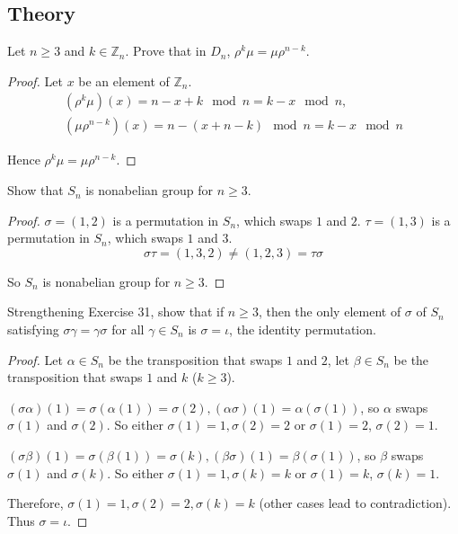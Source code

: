 \subsection*{Theory}

\begin{exercise}
    Let $n\geq 3$ and $k\in\mathbb{Z}_{n}$. Prove that in $D_{n}$, $\rho^{k}\mu = \mu\rho^{n-k}$.
\end{exercise}

\begin{proof}
    Let $x$ be an element of $\mathbb{Z}_{n}$.
    \[
        \begin{split}
            (\rho^{k}\mu)(x) = n - x + k \mod n = k - x\mod n, \\
            (\mu\rho^{n-k})(x) = n - (x + n - k) \mod n = k - x \mod n
        \end{split}
    \]

    Hence $\rho^{k}\mu = \mu\rho^{n-k}$.
\end{proof}

\begin{exercise}
    Show that $S_{n}$ is nonabelian group for $n\geq 3$.
\end{exercise}

\begin{proof}
    $\sigma = (1, 2)$ is a permutation in $S_{n}$, which swaps $1$ and $2$. $\tau = (1, 3)$ is a permutation in $S_{n}$, which swaps $1$ and $3$.
    \[
        \sigma\tau = (1, 3, 2) \ne (1, 2, 3) = \tau\sigma
    \]

    So $S_{n}$ is nonabelian group for $n\geq 3$.
\end{proof}

\begin{exercise}
    Strengthening Exercise 31, show that if $n\geq 3$, then the only element of $\sigma$ of $S_{n}$ satisfying $\sigma\gamma = \gamma\sigma$ for all $\gamma\in S_{n}$ is $\sigma = \iota$, the identity permutation.
\end{exercise}

\begin{proof}
    Let $\alpha\in S_{n}$ be the transposition that swaps $1$ and $2$, let $\beta\in S_{n}$ be the transposition that swaps $1$ and $k$ ($k\geq 3$).

    $(\sigma\alpha)(1) = \sigma(\alpha(1)) = \sigma(2), (\alpha\sigma)(1) = \alpha(\sigma(1))$, so $\alpha$ swaps $\sigma(1)$ and $\sigma(2)$. So either $\sigma(1) = 1, \sigma(2) = 2$ or $\sigma(1) = 2$, $\sigma(2) = 1$.

    $(\sigma\beta)(1) = \sigma(\beta(1)) = \sigma(k), (\beta\sigma)(1) = \beta(\sigma(1))$, so $\beta$ swaps $\sigma(1)$ and $\sigma(k)$. So either $\sigma(1) = 1, \sigma(k) = k$ or $\sigma(1) = k$, $\sigma(k) = 1$.

    Therefore, $\sigma(1) = 1, \sigma(2) = 2, \sigma(k) = k$ (other cases lead to contradiction). Thus $\sigma = \iota$.
\end{proof}

